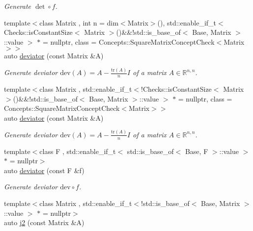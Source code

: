 \begin{DoxyCompactItemize}
\begin{DoxyCompactList}\small\item\em Generate $\det\circ f$. \end{DoxyCompactList}\item 
{\footnotesize template$<$class Matrix , int n = dim$<$\+Matrix$>$(), std\+::enable\+\_\+if\+\_\+t$<$ Checks\+::is\+Constant\+Size$<$ Matrix $>$()\&\&!std\+::is\+\_\+base\+\_\+of$<$ Base, Matrix $>$\+::value $>$ $\ast$  = nullptr, class  = Concepts\+::\+Square\+Matrix\+Concept\+Check$<$\+Matrix$>$$>$ }\\auto \hyperlink{group__LinearAlgebraGroup_ga7c0b1db93cfc5779a3b1e7eb1646c213}{deviator} (const Matrix \&A)
\begin{DoxyCompactList}\small\item\em Generate deviator $ \mathrm{dev}(A) = A - \frac{\mathrm{tr}(A)}{n}I $ of a matrix $ A\in\mathbb{R}^{n,n} $. \end{DoxyCompactList}\item 
{\footnotesize template$<$class Matrix , std\+::enable\+\_\+if\+\_\+t$<$!\+Checks\+::is\+Constant\+Size$<$ Matrix $>$()\&\&!std\+::is\+\_\+base\+\_\+of$<$ Base, Matrix $>$\+::value $>$ $\ast$  = nullptr, class  = Concepts\+::\+Square\+Matrix\+Concept\+Check$<$\+Matrix$>$$>$ }\\auto \hyperlink{group__LinearAlgebraGroup_gabc90de0d1754cd2e2d190ea8ba62245f}{deviator} (const Matrix \&A)
\begin{DoxyCompactList}\small\item\em Generate deviator $ \mathrm{dev}(A) = A - \frac{\mathrm{tr}(A)}{n}I $ of a matrix $ A\in\mathbb{R}^{n,n} $. \end{DoxyCompactList}\item 
{\footnotesize template$<$class F , std\+::enable\+\_\+if\+\_\+t$<$ std\+::is\+\_\+base\+\_\+of$<$ Base, F $>$\+::value $>$ $\ast$  = nullptr$>$ }\\auto \hyperlink{group__LinearAlgebraGroup_gad363f3add577abc046fc525ce83e22d3}{deviator} (const F \&f)
\begin{DoxyCompactList}\small\item\em Generate deviator $ \mathrm{dev}\circ f$. \end{DoxyCompactList}\item 
{\footnotesize template$<$class Matrix , std\+::enable\+\_\+if\+\_\+t$<$!std\+::is\+\_\+base\+\_\+of$<$ Base, Matrix $>$\+::value $>$ $\ast$  = nullptr$>$ }\\auto \hyperlink{group__InvariantGroup_ga9a2bc859fe1ae34b1a3ada91a39d69df}{j2} (const Matrix \&A)

\end{DoxyCompactItemize}
